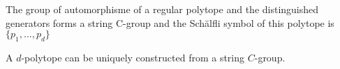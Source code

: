 \begin{property}
  The group of automorphisme of a regular polytope and the distinguished generators forms a string C-group and the Schälfli symbol of this polytope is $\{p_1, \dots, p_d\}$
\end{property}

\begin{property}
  A $d$-polytope can be uniquely constructed from a string $C$-group.
\end{property}

